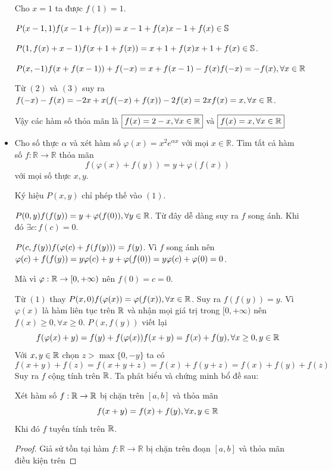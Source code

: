 \documentclass[11pt]{scrartcl}
\begin{document}
\begin{itemize}[label=, leftmargin=0em, itemsep=0.5em]
\begin{sol}
        Cho $x = 1$ ta được $f(1) = 1$.
        

        $P(x- 1, 1) \ra f(x - 1 + f(x))  = x - 1 +f(x) \ra x - 1 + f(x) \in \bb{S}$

        $P(1, f(x) + x - 1) \ra f(x + 1 + f(x)) = x + 1  + f(x) \ra x + 1 + f(x) \in \bb{S}$.

        $P(x,-1)\ra f(x + f(x - 1)) + f(-x) = x + f(x - 1) - f(x) \lra f(-x) = -f(x), \xr$
        
        Từ $(2)$ và $(3)$ suy ra $f(-x) - f(x) = -2x +x(f(-x) + f(x)) \lra -2f(x) = 2x \lra f(x) = x, \xr$.

        Vậy các hàm số thỏa mãn là $\boxed{f(x) = 2-x,\forall x\in \mathbb{R}}$ và $\boxed{f(x) = x,\forall x\in \mathbb{R}}$
    \end{sol}
    \item \begin{bt}
         Cho số thực $\alpha$ và xét hàm số $\varphi(x)=x^2 e^{\alpha x}$ với mọi $x \in \mathbb{R}$. Tìm tất cả hàm số $f: \mathbb{R} \rightarrow \mathbb{R}$ thỏa mãn
            $$
            f(\varphi(x)+f(y))=y+\varphi(f(x))
            $$
            với mọi số thực $x, y$.
    \end{bt}
   
    \begin{sol}
        Ký hiệu $P(x,y)$ chỉ phép thế vào $(1)$. 

        $P(0,y) \ra f(f(y)) = y + \varphi(f(0)),\yr$. Từ đây dễ dàng suy ra $f$ song ánh. Khi đó $\exists c: f(c) = 0$.

        $P(c,f(y)) \ra f(\varphi(c) + f(f(y))) = f(y) $. Vì $f$ song ánh nên $\varphi(c) + f(f(y)) = y \lra \varphi(c) + y + \varphi(f(0)) = y \lra \varphi(c) + \varphi(0) = 0$.

        Mà vì $\varphi: \mathbb{R} \to [0,+\infty)$ nên $f(0) = c = 0$. 

        Từ $(1)$ thay $P(x,0) \ra f(\varphi(x)) = \varphi(f(x)) , \xr$. Suy ra $f(f(y)) = y$. Vì $\varphi(x)$ là hàm liên tục trên $\mathbb{R}$ và nhận mọi giá trị trong $[0,+\infty)$ nên $f(x) \geq 0, \forall x \geq 0$. $P(x,f(y))$ viết lại 
        \[
            f(\varphi(x) + y) = f(y) + f(\varphi(x)) \lra f(x + y) = f(x) + f(y), \forall x \geq 0, y \in \bb{R}
        \]
        Với $x,y\in \mathbb{R}$ chọn $z > \max\{0,-y\}$ ta có 
        \[
        f(x + y) + f(z) = f(x + y + z) = f(x) + f(y + z) = f(x) + f(y) + f(z)
        \]
        Suy ra $f$ cộng tính trên $\mathbb{R}$. Ta phát biểu và chứng minh bổ đề sau:
        \begin{lemma}
            Xét hàm số $f: \mathbb{R} \to \mathbb{R}$ bị chặn trên $[a,b]$ và thỏa mãn 
            \[
            f(x + y) = f(x) + f(y),\forall x,y \in \mathbb{R}
            \]
            Khi đó $f$ tuyến tính trên $\mathbb{R}$.    
        \end{lemma}
        \begin{proof}
            Giả sử tồn tại hàm $f: \mathbb{R} \rightarrow \mathbb{R}$ bị chặn trên đoạn $[a , b]$ và thỏa mãn điều kiện trên
            

\end{proof}
\end{sol}
\end{itemize}
\end{document}
